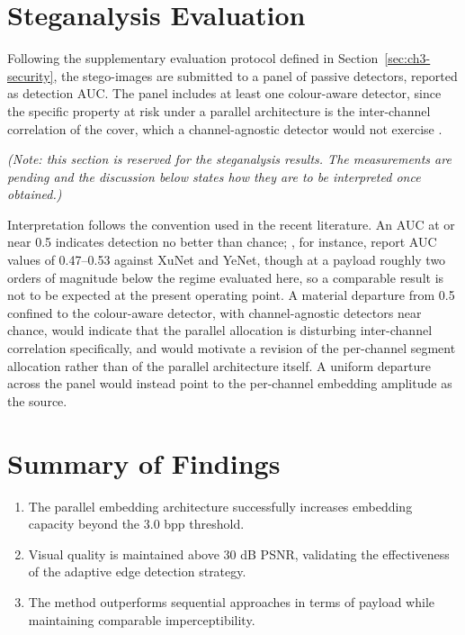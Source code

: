 \section{Steganalysis Evaluation} \label{sec:ch4-steganalysis}
Following the supplementary evaluation protocol defined in Section~\ref{sec:ch3-security}, the stego-images are submitted to a panel of passive detectors, reported as detection AUC. The panel includes at least one colour-aware detector, since the specific property at risk under a parallel architecture is the inter-channel correlation of the cover, which a channel-agnostic detector would not exercise \citep{amrutha2023rgbsteganalysis}.

\textit{(Note: this section is reserved for the steganalysis results. The measurements are pending and the discussion below states how they are to be interpreted once obtained.)}

Interpretation follows the convention used in the recent literature. An AUC at or near 0.5 indicates detection no better than chance; \citet{alrawashdeh2025hed}, for instance, report AUC values of 0.47--0.53 against XuNet and YeNet, though at a payload roughly two orders of magnitude below the regime evaluated here, so a comparable result is not to be expected at the present operating point. A material departure from 0.5 confined to the colour-aware detector, with channel-agnostic detectors near chance, would indicate that the parallel allocation is disturbing inter-channel correlation specifically, and would motivate a revision of the per-channel segment allocation rather than of the parallel architecture itself. A uniform departure across the panel would instead point to the per-channel embedding amplitude as the source.

\section{Summary of Findings}
\begin{enumerate}
    \item The parallel embedding architecture successfully increases embedding capacity beyond the 3.0 bpp threshold.
    \item Visual quality is maintained above 30 dB PSNR, validating the effectiveness of the adaptive edge detection strategy.
    \item The method outperforms sequential approaches in terms of payload while maintaining comparable imperceptibility.
\end{enumerate}

